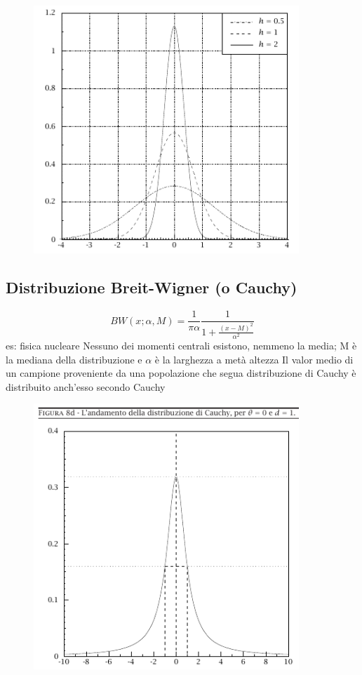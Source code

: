 \documentclass[12pt]{report}
\theoremstyle{remark}
\theoremstyle{theorem}
\begin{document}
\begin{figure}[H]
    \centering
    \includegraphics[width=10cm]{immagini/gauss.png}
    \label{fig:gauss}
\end{figure}

\subsection*{Distribuzione Breit-Wigner (o Cauchy)}
\[BW(x;\alpha,M) = \frac{1}{\pi\alpha}\frac{1}{1+\frac{{(x-M)}^2}{\alpha^2}}\]
es: fisica nucleare \newline
Nessuno dei momenti centrali esistono, nemmeno la media; M è la mediana della distribuzione e $\alpha$ è la larghezza a metà altezza \newline
Il valor medio di un campione proveniente da una popolazione che segua distribuzione di Cauchy è distribuito anch'esso secondo Cauchy

\begin{figure}[H]
    \centering
    \includegraphics[width=10cm]{immagini/breit-wigner.png}
    \label{fig:breit}
\end{figure}
\end{document}
